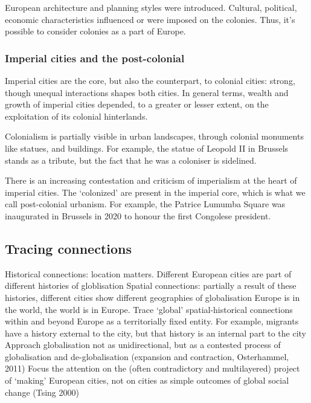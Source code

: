 \documentclass{article}
\begin{document}
European architecture and planning styles were introduced. Cultural, political, economic characteristics influenced or were imposed on the colonies. 
Thus, it's possible to consider colonies as a part of Europe.

\subsubsection{Imperial cities and the post-colonial}

Imperial cities are the core, but also the counterpart, to colonial cities: strong, though unequal interactions shapes both cities.
In general terms, wealth and growth of imperial cities depended, to a greater or lesser extent, on the exploitation of its colonial hinterlands.

Colonialism is partially visible in urban landscapes, through colonial monuments like statues, and buildings. For example, the statue of Leopold II in Brussels stands as a tribute, but the fact that he was a coloniser is sidelined.

There is an increasing contestation and criticism of imperialism at the heart of imperial cities. The `colonized' are present in the imperial core, which is what we call post-colonial urbanism. For example, the Patrice Lumumba Square was inaugurated in Brussels in 2020 to honour the first Congolese president.

\subsection{Tracing connections}

\begin{outline}
	\1 Historical connections: location matters. Different European cities are part of different histories of globlisation
	\1 Spatial connections: partially a result of these histories, different cities show different geographies of globalisation
	\1 Europe is in the world, the world is in Europe. Trace `global' spatial-historical connections within and beyond Europe as a territorially fixed entity. For example, migrants have a history external to the city, but that history is an internal part to the city
	\1 Approach globalisation not as unidirectional, but as a contested process of globalisation and de-globalisation (expansion and contraction, Osterhammel, 2011)
	\1 Focus the attention on the (often contradictory and multilayered) project of `making' European cities, not on cities as simple outcomes of global social change (Tsing 2000)
\end{outline}
\end{document}
